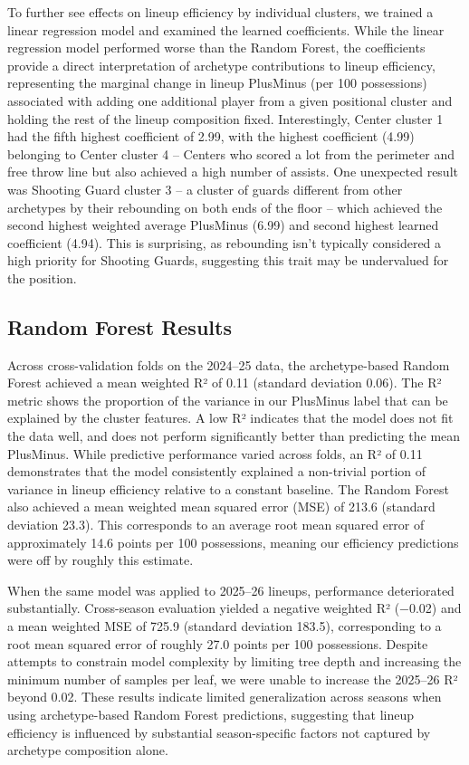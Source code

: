 \documentclass{article}
\begin{document}
To further see effects on lineup efficiency by individual clusters, we trained a linear regression 
model and examined the learned coefficients. While the linear regression model performed worse 
than the Random Forest, the coefficients provide a direct interpretation of archetype contributions 
to lineup efficiency, representing the marginal change in lineup PlusMinus (per 100 possessions) 
associated with adding one additional player from a given positional cluster and holding the 
rest of the lineup composition fixed. Interestingly, Center cluster 1 had the fifth highest 
coefficient of 2.99, with the highest coefficient (4.99) belonging to Center cluster 4 – Centers 
who scored a lot from the perimeter and free throw line but also achieved a high number of assists. 
One unexpected result was Shooting Guard cluster 3 – a cluster of guards different from other 
archetypes by their rebounding on both ends of the floor – which achieved the second highest 
weighted average PlusMinus (6.99) and second highest learned coefficient (4.94). This is surprising, 
as rebounding isn’t typically considered a high priority for Shooting Guards, suggesting this trait 
may be undervalued for the position. 



\subsection{Random Forest Results}
Across cross-validation folds on the 2024–25 data, the archetype-based Random Forest achieved a mean 
weighted R² of 0.11 (standard deviation 0.06). The R² metric shows the proportion of the variance in 
our PlusMinus label that can be explained by the cluster features. A low R² indicates that the model 
does not fit the data well, and does not perform significantly better than predicting the mean 
PlusMinus. While predictive performance varied across folds, an R² of 0.11 demonstrates that the 
model consistently explained a non-trivial portion of variance in lineup efficiency relative to a 
constant baseline. The Random Forest also achieved a mean weighted mean squared error (MSE) of 
213.6 (standard deviation 23.3). This corresponds to an average root mean squared error of approximately 
14.6 points per 100 possessions, meaning our efficiency predictions were off by roughly this estimate. 

When the same model was applied to 2025–26 lineups, performance deteriorated substantially. Cross-season 
evaluation yielded a negative weighted R² (−0.02) and a mean weighted MSE of 725.9 (standard deviation 183.5), 
corresponding to a root mean squared error of roughly 27.0 points per 100 possessions. Despite 
attempts to constrain model complexity by limiting tree depth and increasing the minimum number 
of samples per leaf, we were unable to increase the 2025–26 R² beyond 0.02. These results indicate 
limited generalization across seasons when using archetype-based Random Forest predictions, suggesting 
that lineup efficiency is influenced by substantial season-specific factors not captured by archetype 
composition alone.
\end{document}
